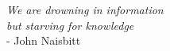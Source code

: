 \vspace{30pt}
\emph{We are drowning in information} \\\vspace{6pt}
\emph{but starving for knowledge}
\\\vspace{20pt}
 - John Naisbitt

\begin{comment}
 \vspace{50pt}
 \emph{I'm surrounded by idiots}
 \\\vspace{20pt}
  - Scar
\end{comment}
